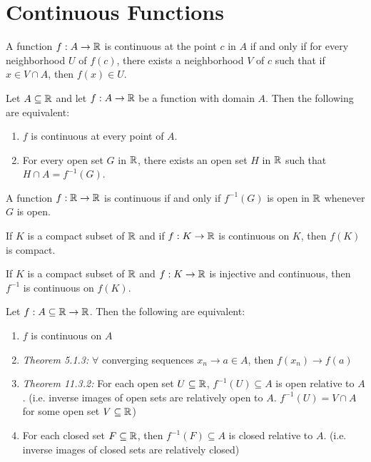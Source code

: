 \section{Continuous Functions}

\begin{lemma}
	A function $f:A \to \mathbb{R}$ is continuous at the point $c$ in $A$ if and only if for every neighborhood $U$ of $f(c)$, there exists a neighborhood $V$ of $c$ such that if $x \in V\cap A$, then $f(x) \in U$.
\end{lemma}

\begin{theorem}
	Let $A \subseteq \mathbb{R}$ and let $f:A \to \mathbb{R}$ be a function with domain $A$. Then the following are equivalent:
	\begin{enumerate}
		\item $f$ is continuous at every point of $A$.
		\item For every open set $G$ in $\mathbb{R}$, there exists an open set $H$ in $\mathbb{R}$ such that $H \cap A=f^{-1}(G)$.
	\end{enumerate}
\end{theorem}

\begin{corollary}
	A function $f:\mathbb{R}\to\mathbb{R}$ is continuous if and only if $f^{-1}(G)$ is open in $\mathbb{R}$ whenever $G$ is open.
\end{corollary}

\begin{theorem}
	If $K$ is a compact subset of $\mathbb{R}$ and if $f:K \to \mathbb{R}$ is continuous on $K$, then $f(K)$ is compact.
\end{theorem}

\begin{theorem}
	If $K$ is a compact subset of $\mathbb{R}$ and $f:K \to \mathbb{R}$ is injective and continuous, then $f^{-1}$ is continuous on $f(K)$.
\end{theorem}

\begin{theorem}
	Let $f:A \subseteq \mathbb{R} \to \mathbb{R}$. Then the following are equivalent:
	\begin{enumerate}
		\item $f$ is continuous on $A$
		\item \textit{Theorem 5.1.3:} $\forall$ converging sequences $x_n \to a \in A$, then $f(x_n) \to f(a)$
		\item \textit{Theorem 11.3.2:} For each open set $U \subseteq \mathbb{R}$, $f^{-1}(U) \subseteq A$ is open relative to $A$. (i.e. inverse images of open sets are relatively open to $A$. $f^{-1}(U)=V \cap A$ for some open set $V \subseteq \mathbb{R}$)
		\item For each closed set $F \subseteq \mathbb{R}$, then $f^{-1}(F) \subseteq A$ is closed relative to $A$. (i.e. inverse images of closed sets are relatively closed)
	\end{enumerate}
\end{theorem}
